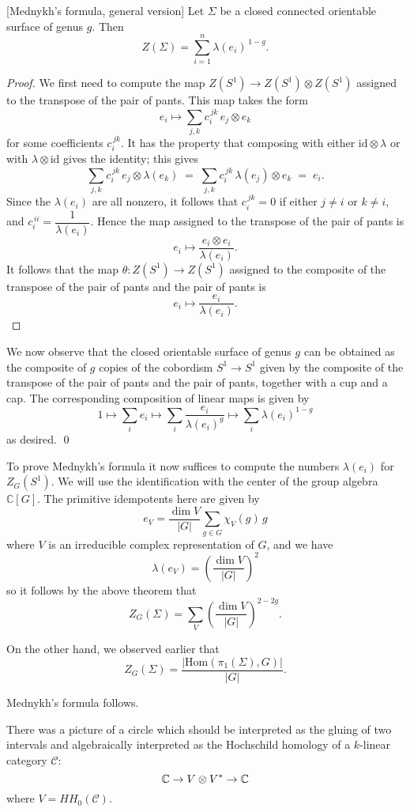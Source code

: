 \documentclass[12pt]{article}
\begin{document}
\begin{theorem}\label{thm:mednykh-general}[Mednykh's formula, general version]
Let $\Sigma$ be a closed connected orientable surface of genus $g$. Then
\[
Z(\Sigma)=\sum_{i=1}^n \lambda(e_i)^{\,1-g}. \tag{30}
\]
\end{theorem}

\begin{proof}
We first need to compute the map $Z(S^1)\to Z(S^1)\otimes Z(S^1)$ assigned to the transpose
of the pair of pants. This map takes the form
\[
e_i \longmapsto \sum_{j,k} c^{\,jk}_i\, e_j\otimes e_k \tag{31}
\]
for some coefficients $c^{\,jk}_i$. It has the property that composing with either
$\mathrm{id}\otimes \lambda$ or with $\lambda\otimes \mathrm{id}$ gives the identity; this gives
\[
\sum_{j,k} c^{\,jk}_i\, e_j\otimes \lambda(e_k)
\;=\;
\sum_{j,k} c^{\,jk}_i\, \lambda(e_j)\otimes e_k
\;=\; e_i. \tag{32}
\]
Since the $\lambda(e_i)$ are all nonzero, it follows that $c^{\,jk}_i=0$ if either $j\neq i$ or $k\neq i$, and
$c^{\,ii}_i=\dfrac{1}{\lambda(e_i)}$. Hence the map assigned to the transpose of the pair of pants is
\[
e_i \longmapsto \frac{e_i\otimes e_i}{\lambda(e_i)}. \tag{33}
\]
It follows that the map $\theta: Z(S^1)\to Z(S^1)$ assigned to the composite of the transpose of
the pair of pants and the pair of pants is
\[
e_i \longmapsto \frac{e_i}{\lambda(e_i)}. \tag{34}
\]
\end{proof}
We now observe that the closed orientable surface of genus $g$ can be obtained as the
composite of $g$ copies of the cobordism $S^1 \to S^1$ given by the composite of the transpose of
the pair of pants and the pair of pants, together with a cup and a cap. The corresponding
composition of linear maps is given by
\[
1 \longmapsto \sum_i e_i \longmapsto \sum_i \frac{e_i}{\lambda(e_i)^g} \longmapsto \sum_i \lambda(e_i)^{1-g} \tag{35}
\]
as desired. \qed

\medskip

To prove Mednykh’s formula it now suffices to compute the numbers $\lambda(e_i)$ for $Z_G(S^1)$.
We will use the identification with the center of the group algebra $\mathbb{C}[G]$. The primitive
idempotents here are given by
\[
e_V = \frac{\dim V}{|G|} \sum_{g\in G} \chi_V(g)\,g \tag{36}
\]
where $V$ is an irreducible complex representation of $G$, and we have
\[
\lambda(e_V) = \left(\frac{\dim V}{|G|}\right)^2 \tag{37}
\]
so it follows by the above theorem that
\[
Z_G(\Sigma) = \sum_V \left(\frac{\dim V}{|G|}\right)^{2-2g}. \tag{38}
\]

On the other hand, we observed earlier that
\[
Z_G(\Sigma) = \frac{|\mathrm{Hom}(\pi_1(\Sigma),G)|}{|G|}. \tag{39}
\]

Mednykh's formula follows.

\begin{remark}
    There was a picture of a circle which should be interpreted as the gluing of two intervals and algebraically interpreted as the Hochschild homology of a $k$-linear category $\mathcal{C}$:
\[
\mathbb{C} \to V \otimes V^* \to \mathbb{C}
\]
where $V = HH_0(\mathcal{C})$.
\end{remark}
\end{document}
